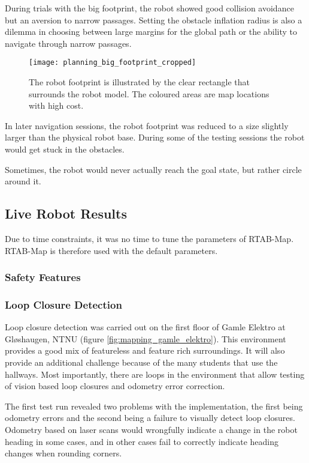 During trials with the big footprint, the robot showed good collision avoidance but an aversion to narrow passages. Setting the obstacle inflation radius is also a dilemma in choosing between large margins for the global path or the ability to navigate through narrow passages. 

\begin{figure}[h]
	\centering
	\texttt{[image: planning\_big\_footprint\_cropped]}
	\caption{The robot footprint is illustrated by the clear rectangle that surrounds the robot model. The coloured areas are map locations with high cost. }
	\label{fig:big_footprint}
\end{figure}

In later navigation sessions, the robot footprint was reduced to a size slightly larger than the physical robot base. During some of the testing sessions the robot would get stuck in the obstacles. 

Sometimes, the robot would never actually reach the goal state, but rather circle around it. 

\subsection{Live Robot Results}

Due to time constraints, it was no time to tune the parameters of \ac{RTAB-Map}. \ac{RTAB-Map} is therefore used with the default parameters. 

\subsubsection{Safety Features}


\subsubsection{Loop Closure Detection}

Loop closure detection was carried out on the first floor of Gamle Elektro at Gløshaugen, NTNU (figure \ref{fig:mapping_gamle_elektro}). This environment provides a good mix of featureless and feature rich surroundings. It will also provide an additional challenge because of the many students that use the hallways. Most importantly, there are loops in the environment that allow testing of vision based loop closures and odometry error correction. 

The first test run revealed two problems with the implementation, the first being odometry errors and the second being a failure to visually detect loop closures. Odometry based on laser scans would wrongfully indicate a change in the robot heading in some cases, and in other cases fail to correctly indicate heading changes when rounding corners. 

